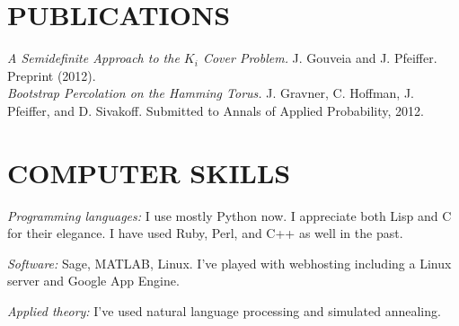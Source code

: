 \documentclass{res}
\begin{document}
\begin{resume}
\section{PUBLICATIONS}
{\em A Semidefinite Approach to the $K_i$ Cover Problem.} J. Gouveia and J. Pfeiffer. Preprint (2012).\\
{\em Bootstrap Percolation on the Hamming Torus.} J. Gravner, C. Hoffman, J. Pfeiffer, and D. Sivakoff. Submitted to Annals of Applied Probability, 2012.


\section{COMPUTER SKILLS}          
    {\em Programming languages:} I use mostly Python now. I appreciate both Lisp and C for their elegance. I have used Ruby, Perl, and C++ as well in the past.

	{\em Software:} Sage, MATLAB, Linux. I've played with webhosting including a Linux server and Google App Engine. 

    {\em Applied theory:} I've used natural language processing and simulated annealing.


 
 
  
 
\end{resume}
\end{document}

